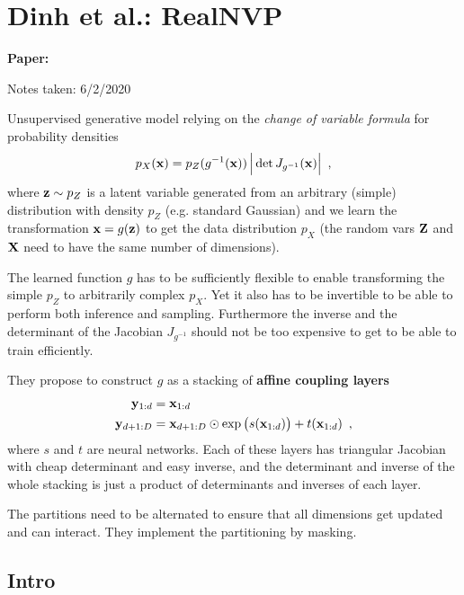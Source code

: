 \clearpage

\section{Dinh et al.: RealNVP}\label{sec:realNVP}

\begin{notebox}
\textbf{Paper: } 

\hfill Notes taken: 6/2/2020 
\end{notebox}

\begin{notebox}
\tldr Unsupervised generative model relying on the \emph{change of variable formula} for probability densities
\begin{equation}
p_X(\mathbf{x}) = p_Z(g^{-1}(\mathbf{x})) \,\Big\lvert \det J_{g^{-1}}(\mathbf{x}) \Big\rvert \enspace ,
\end{equation}
where $\mathbf{z} \sim p_Z$ is a latent variable generated from an arbitrary (simple) distribution with density $p_Z$ (e.g. standard Gaussian) and we learn the transformation $\mathbf{x} = g(\mathbf{z})$ to get the data distribution $p_X$ (the random vars $\mathbf{Z}$ and $\mathbf{X}$ need to have the same number of dimensions).

The learned function $g$ has to be sufficiently flexible to enable transforming the simple $p_Z$ to arbitrarily complex $p_X$. Yet it also has to be invertible to be able to perform both inference and sampling. Furthermore the inverse and the determinant of the Jacobian $J_{g^{-1}}$ should not be too expensive to get to be able to train efficiently.

They propose to construct $g$ as a stacking of \textbf{affine coupling layers}
\begin{align}
\mathbf{y}_{1:d} & = \mathbf{x}_{1:d} \nonumber \\
\mathbf{y}_{d+1:D} & = \mathbf{x}_{d+1:D} \odot \exp\big(s(\mathbf{x}_{1:d})\big) + t(\mathbf{x}_{1:d}) \enspace ,
\end{align}
where $s$ and $t$ are neural networks.
Each of these layers has triangular Jacobian with cheap determinant and easy inverse, and the determinant and inverse of the whole stacking is just a product of determinants and inverses of each layer.

The partitions need to be alternated to ensure that all dimensions get updated and can interact. They implement the partitioning by masking.
\end{notebox}

\subsection{Intro}

